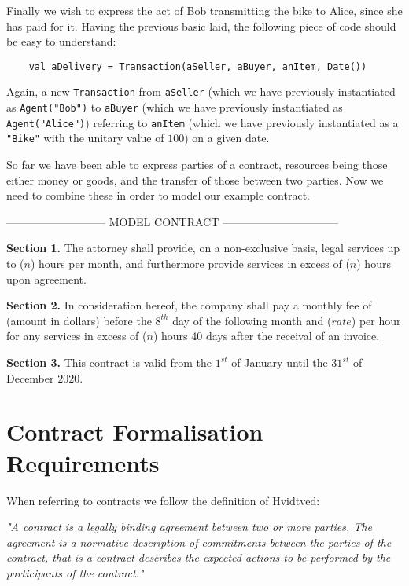 \documentclass{ituthesis}
\begin{document}
Finally we wish to express the act of Bob transmitting the bike to Alice, since she has paid for it. Having the previous basic laid, the following piece of code should be easy to understand:
\begin{lstlisting}
	val aDelivery = Transaction(aSeller, aBuyer, anItem, Date())
\end{lstlisting}
Again, a new \texttt{Transaction} from \texttt{aSeller} (which we have previously instantiated as \texttt{Agent("Bob")} to \texttt{aBuyer} (which we have previously instantiated as \texttt{Agent("Alice")}) referring to \texttt{anItem} (which we have previously instantiated as a \texttt{"Bike"} with the unitary value of $100$) on a given date.

So far we have been able to express parties of a contract, resources being those either money or goods, and the transfer of those between two parties. Now we need to combine these in order to model our example contract.

--------------------------- MODEL CONTRACT --------------------------------

\begin{tcolorbox}
\textbf{Section 1.} The attorney shall provide, on a non-exclusive basis, legal services up to ($n$) hours per month, and furthermore provide services in excess of ($n$) hours upon agreement.\par
\textbf{Section 2.} In consideration hereof, the company shall pay a monthly fee of (amount in dollars) before the $8^{th}$ day of the following month and ($rate$) per hour for any services in excess of ($n$) hours 40 days after the receival of an invoice.\par
\textbf{Section 3.} This contract is valid from the $1^{st}$ of January until the $31^{st}$ of December $2020$.
\end{tcolorbox}

\section{Contract Formalisation Requirements}
When referring to contracts we follow the definition of Hvidtved:
\begin{displayquote}
\textit{"A contract is a legally binding agreement between two or more
parties. The agreement is a normative description of commitments between the parties of the contract, that is a contract describes the expected actions to be performed by the participants of the contract."}
\cite{hvitved2011contract}
\end{displayquote}
\end{document}
